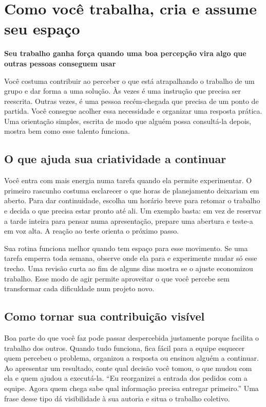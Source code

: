 \documentclass[11pt,a4paper]{article}
\newcommand{\subtituloleitura}[1]{\textbf{#1}\par\nopagebreak[4]}
\begin{document}
\clearpage
\section*{Como você trabalha, cria e assume seu espaço}
\subtituloleitura{Seu trabalho ganha força quando uma boa percepção vira algo que outras pessoas conseguem usar}

Você costuma contribuir ao perceber o que está atrapalhando o trabalho de um grupo e dar forma a uma solução. Às vezes é uma instrução que precisa ser reescrita. Outras vezes, é uma pessoa recém-chegada que precisa de um ponto de partida. Você consegue acolher essa necessidade e organizar uma resposta prática. Uma orientação simples, escrita de modo que alguém possa consultá-la depois, mostra bem como esse talento funciona.

\subsection*{O que ajuda sua criatividade a continuar}

Você entra com mais energia numa tarefa quando ela permite experimentar. O primeiro rascunho costuma esclarecer o que horas de planejamento deixariam em aberto. Para dar continuidade, escolha um horário breve para retomar o trabalho e decida o que precisa estar pronto até ali. Um exemplo basta: em vez de reservar a tarde inteira para pensar numa apresentação, prepare uma abertura e teste-a em voz alta. A reação ao teste orienta o próximo passo.

Sua rotina funciona melhor quando tem espaço para esse movimento. Se uma tarefa emperra toda semana, observe onde ela para e experimente mudar só esse trecho. Uma revisão curta ao fim de alguns dias mostra se o ajuste economizou trabalho. Esse modo de agir permite aproveitar o que você percebe sem transformar cada dificuldade num projeto novo.

\subsection*{Como tornar sua contribuição visível}

Boa parte do que você faz pode passar despercebida justamente porque facilita o trabalho dos outros. Quando tudo funciona, fica fácil para a equipe esquecer quem percebeu o problema, organizou a resposta ou ensinou alguém a continuar. Ao apresentar um resultado, conte qual decisão você tomou, o que mudou com ela e quem ajudou a executá-la. “Eu reorganizei a entrada dos pedidos com a equipe. Agora quem chega sabe qual informação precisa entregar primeiro.” Uma frase desse tipo dá visibilidade à sua autoria e situa o trabalho coletivo.
\end{document}
